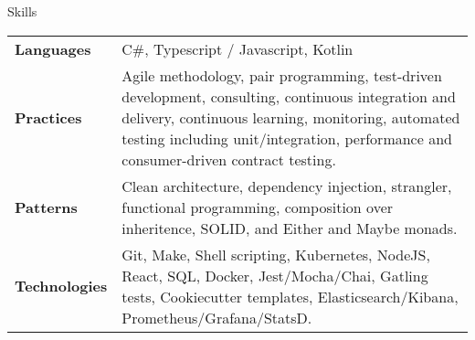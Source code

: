 \begin{section}{Skills}
  \begin{tabularx}{\linewidth}{@{}l X@{}}
    \textbf{Languages} &\small{C\#, Typescript / Javascript, Kotlin} \\
    \textbf{Practices} &\small{Agile methodology, pair programming, test-driven development, consulting, continuous integration and delivery, continuous learning, monitoring, automated testing including unit/integration, performance and consumer-driven contract testing.} \\
    \textbf{Patterns} &\small{Clean architecture, dependency injection, strangler, functional programming, composition over inheritence, SOLID, and Either and Maybe monads.} \\
    \textbf{Technologies} &\small{Git, Make, Shell scripting, Kubernetes, NodeJS, React, SQL, Docker, Jest/Mocha/Chai, Gatling tests, Cookiecutter templates, Elasticsearch/Kibana, Prometheus/Grafana/StatsD.} \\ 
  \end{tabularx}
\end{section}
